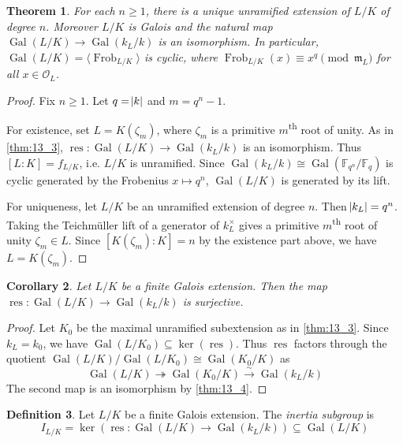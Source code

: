 \documentclass[11pt]{article}
\theoremstyle{definition}
\newtheorem{definition}{Definition}[subsection]
\theoremstyle{plain}
\newtheorem{theorem}[definition]{Theorem}
\newtheorem{corollary}[definition]{Corollary}
\theoremstyle{remark}
\DeclareMathOperator{\Gal}{Gal}
\DeclareMathOperator{\res}{res}
\DeclareMathOperator{\Frob}{Frob}
\newcommand{\FF}{\mathbb{F}}
\newcommand{\cO}{\mathcal{O}}
\newcommand{\fm}{\mathfrak{m}}
\begin{document}
\begin{theorem}\label{thm:13_4}
    For each $n \ge 1$, there is a unique unramified extension of $L/K$ of degree $n$. Moreover $L/K$ is Galois and the natural map $\Gal(L/K) \to \Gal(k_L / k)$ is an isomorphism. In particular, $\Gal(L/K) = \langle \Frob_{L/K} \rangle$ is cyclic, where $\Frob_{L/K}(x) \equiv x^q \pmod{\fm_L}$ for all $x \in \cO_L$.
\end{theorem}
\begin{proof}
    Fix $n \ge 1$. Let $q = \abs{k}$ and $m = q^n - 1$.

    For existence, set $L = K(\zeta_m)$, where $\zeta_m$ is a primitive $m$\textsuperscript{th} root of unity. As in \autoref{thm:13_3}, $\res : \Gal(L/K) \to \Gal(k_L/k)$ is an isomorphism. Thus $[L : K] = f_{L/K}$, i.e. $L/K$ is unramified. Since $\Gal(k_L/k) \cong \Gal(\FF_{q^n}/\FF_q)$ is cyclic generated by the Frobenius $x \mapsto q^n$, $\Gal(L/K)$ is generated by its lift.

    For uniqueness, let $L/K$ be an unramified extension of degree $n$. Then $\abs{k_L} = q^n$. Taking the Teichm\"uller lift of a generator of $k_L^\times$ gives a primitive $m$\textsuperscript{th} root of unity $\zeta_m \in L$. Since $[K(\zeta_m) : K] = n$ by the existence part above, we have $L = K(\zeta_m)$.
\end{proof}

\begin{corollary}\label{cor:13_5}
    Let $L/K$ be a finite Galois extension. Then the map $\res : \Gal(L/K) \to \Gal(k_L / k)$ is surjective.
\end{corollary}
\begin{proof}
    Let $K_0$ be the maximal unramified subextension as in \autoref{thm:13_3}. Since $k_L = k_0$, we have $\Gal(L/K_0) \subseteq \ker(\res)$. Thus $\res$ factors through the quotient $\Gal(L/K) / \Gal(L / K_0) \cong \Gal(K_0 / K)$ as
    \begin{equation*}
        \Gal(L / K) \twoheadrightarrow \Gal(K_0 / K) \xrightarrow{\sim} \Gal(k_L / k)
    \end{equation*}
    The second map is an isomorphism by \autoref{thm:13_4}.
\end{proof}

\begin{definition}\label{def:13_6}
    Let $L/K$ be a finite Galois extension. The \emph{inertia subgroup} is
    \begin{equation*}
        I_{L/K} = \ker(\res : \Gal(L/K) \to \Gal(k_L / k)) \subseteq \Gal(L/K)
    \end{equation*}
\end{definition}
\end{document}
